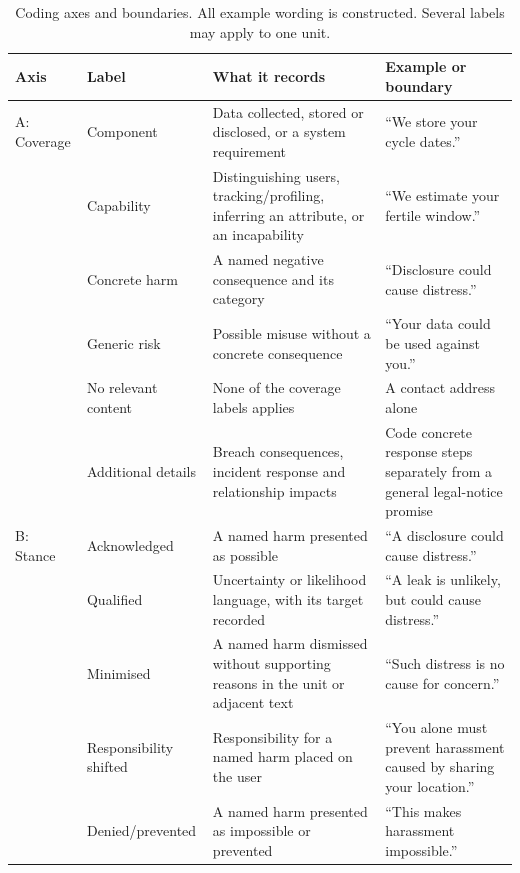 \begin{table}[!t]
\centering
\begin{singlespace}
\caption[Coding axes and boundaries]{Coding axes and boundaries. All example wording is constructed.
Several labels may apply to one unit.}
\label{tab:axes}
\small
\setlength{\aboverulesep}{0.25ex}\setlength{\belowrulesep}{0.35ex}
\begin{tabularx}{\textwidth}{@{}L{1.6cm}L{2.8cm}>{\raggedright\arraybackslash}X>{\raggedright\arraybackslash}X@{}}
\toprule
\textbf{Axis} & \textbf{Label} & \textbf{What it records} & \textbf{Example or boundary} \\
\midrule
A: Coverage & Component & Data collected, stored or disclosed, or a system requirement
  & \enquote{We store your cycle dates.} \\
\rowrule
 & Capability & Distinguishing users, tracking/profiling, inferring an attribute, or an incapability
  & \enquote{We estimate your fertile window.} \\
\rowrule
 & Concrete harm & A named negative consequence and its category
  & \enquote{Disclosure could cause distress.} \\
\rowrule
 & Generic risk & Possible misuse without a concrete consequence
  & \enquote{Your data could be used against you.} \\
\rowrule
 & No relevant content & None of the coverage labels applies
  & A contact address alone \\
\rowrule
 & Additional details & Breach consequences, incident response and relationship impacts
  & Code concrete response steps separately from a general legal-notice promise \\
\midrule
B: Stance & Acknowledged & A named harm presented as possible
  & \enquote{A disclosure could cause distress.} \\
\rowrule
 & Qualified & Uncertainty or likelihood language, with its target recorded
  & \enquote{A leak is unlikely, but could cause distress.} \\
\rowrule
 & Minimised & A named harm dismissed without supporting reasons in the unit or adjacent text
  & \enquote{Such distress is no cause for concern.} \\
\rowrule
 & Responsibility shifted & Responsibility for a named harm placed on the user
  & \enquote{You alone must prevent harassment caused by sharing your location.} \\
\rowrule
 & Denied/prevented & A named harm presented as impossible or prevented
  & \enquote{This makes harassment impossible.} \\

\end{tabularx}
\end{singlespace}
\end{table}
